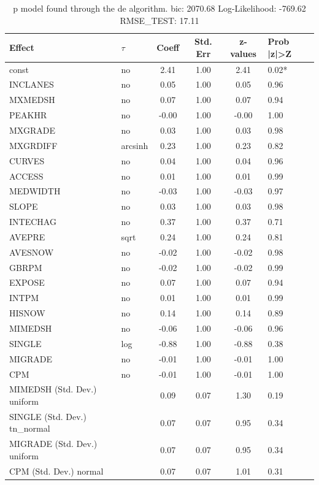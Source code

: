 \begin{table}
	\caption{p model found through the de algorithm. bic: 2070.68 Log-Likelihood: -769.62 RMSE_TEST: 17.11}
	\begin{center}
		\begin{tabular}{|l|l|c|c|c|l|}
			\hline
			Effect & $\tau$ & Coeff & Std. Err & z-values & Prob |z|>Z \\
			\hline
			const & no & 2.41 & 1.00 & 2.41 & 0.02* \\
			\hline
			INCLANES & no & 0.05 & 1.00 & 0.05 & 0.96 \\
			\hline
			MXMEDSH & no & 0.07 & 1.00 & 0.07 & 0.94 \\
			\hline
			PEAKHR & no & -0.00 & 1.00 & -0.00 & 1.00 \\
			\hline
			MXGRADE & no & 0.03 & 1.00 & 0.03 & 0.98 \\
			\hline
			MXGRDIFF & arcsinh & 0.23 & 1.00 & 0.23 & 0.82 \\
			\hline
			CURVES & no & 0.04 & 1.00 & 0.04 & 0.96 \\
			\hline
			ACCESS & no & 0.01 & 1.00 & 0.01 & 0.99 \\
			\hline
			MEDWIDTH & no & -0.03 & 1.00 & -0.03 & 0.97 \\
			\hline
			SLOPE & no & 0.03 & 1.00 & 0.03 & 0.98 \\
			\hline
			INTECHAG & no & 0.37 & 1.00 & 0.37 & 0.71 \\
			\hline
			AVEPRE & sqrt & 0.24 & 1.00 & 0.24 & 0.81 \\
			\hline
			AVESNOW & no & -0.02 & 1.00 & -0.02 & 0.98 \\
			\hline
			GBRPM & no & -0.02 & 1.00 & -0.02 & 0.99 \\
			\hline
			EXPOSE & no & 0.07 & 1.00 & 0.07 & 0.94 \\
			\hline
			INTPM & no & 0.01 & 1.00 & 0.01 & 0.99 \\
			\hline
			HISNOW & no & 0.14 & 1.00 & 0.14 & 0.89 \\
			\hline
			MIMEDSH & no & -0.06 & 1.00 & -0.06 & 0.96 \\
			\hline
			SINGLE & log & -0.88 & 1.00 & -0.88 & 0.38 \\
			\hline
			MIGRADE & no & -0.01 & 1.00 & -0.01 & 1.00 \\
			\hline
			CPM & no & -0.01 & 1.00 & -0.01 & 1.00 \\
			\hline
			MIMEDSH (Std. Dev.) uniform &  & 0.09 & 0.07 & 1.30 & 0.19 \\
			\hline
			SINGLE (Std. Dev.) tn_normal &  & 0.07 & 0.07 & 0.95 & 0.34 \\
			\hline
			MIGRADE (Std. Dev.) uniform &  & 0.07 & 0.07 & 0.95 & 0.34 \\
			\hline
			CPM (Std. Dev.) normal &  & 0.07 & 0.07 & 1.01 & 0.31 \\
			\hline
		\end{tabular}
	\end{center}
\end{table}